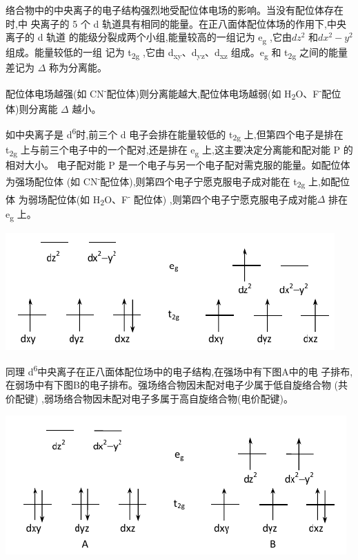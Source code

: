 \documentclass[11pt]{report}
\begin{document}
络合物中的中央离子的电子结构强烈地受配位体电场的影响。当没有配位体存在时,中
央离子的 5 个 d 轨道具有相同的能量。在正八面体配位体场的作用下,中央离子的 d 轨道
的能级分裂成两个小组,能量较高的一组记为 e\textsubscript{g} ,它由\(dz^{2}\) 和\(dx^{2}-y^{2}\) 组成。能量较低的一组
记为 t\textsubscript{2g} ,它由 d\textsubscript{xy}、d\textsubscript{yz}、d\textsubscript{xz} 组成。e\textsubscript{g} 和 t\textsubscript{2g} 之间的能量差记为 \(\Delta\) 称为分离能。

配位体电场越强(如 CN\textsuperscript{-}配位体)则分离能越大,配位体电场越弱(如 H\textsubscript{2}O、F\textsuperscript{-}配位体)则分离能 \(\Delta\) 越小。


如中央离子是 d\textsuperscript{6}时,前三个 d 电子会排在能量较低的 t\textsubscript{2g} 上,但第四个电子是排在 t\textsubscript{2g}
上与前三个电子中的一个配对,还是排在 e\textsubscript{g} 上,这主要决定分离能和配对能 P 的相对大小。
电子配对能 P 是一个电子与另一个电子配对需克服的能量。如配位体为强场配位体
(如 CN\textsuperscript{-}配位体),则第四个电子宁愿克服电子成对能在 t\textsubscript{2g} 上,如配位体
为弱场配位体(如 H\textsubscript{2}O、F\textsuperscript{-}
配位体)
 ,则第四个电子宁愿克服电子成对能\(\Delta\) 排在 e\textsubscript{g} 上。
\begin{center}
\includegraphics[width=.9\linewidth]{../img/1.png}
\end{center}
同理 d\textsuperscript{6}中央离子在正八面体配位场中的电子结构,在强场中有下图A中的电
子排布,在弱场中有下图B的电子排布。强场络合物因未配对电子少属于低自旋络合物
(共价配键) ,弱场络合物因未配对电子多属于高自旋络合物(电价配键)。
\begin{center}
\includegraphics[width=.9\linewidth]{../img/2.png}
\end{center}
\end{document}
